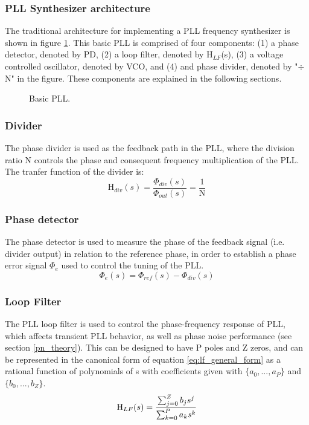 		\subsubsection{PLL Synthesizer architecture}
			The traditional architecture for implementing a PLL frequency synthesizer \cite{Razavi1996DesignOM} is shown in figure \ref{fig:basic_pll}. This basic PLL is comprised of four components: (1) a phase detector, denoted by PD, (2) a loop filter, denoted by H$_{LF}$(s), (3) a voltage controlled oscillator, denoted by VCO, and (4) and phase divider, denoted by "$\div$ N" in the figure. These components are explained in the following sections.
			\begin{figure}[htb!]
				\center
				\caption{Basic PLL.}
				\label{fig:basic_pll}
			\end{figure}
			\FloatBarrier

		\subsubsection{Divider}
			The phase divider is used as the feedback path in the PLL, where the division ratio N controls the phase and consequent frequency multiplication of the PLL. The tranfer function of the divider is:
			\begin{equation}
				\mathrm{H}_{div}(s) = \frac{\Phi_{div}(s)}{\Phi_{out}(s)} = \frac{1}{\mathrm{N}}
			\end{equation}

			\subsubsection{Phase detector}
			The phase detector is used to measure the phase of the feedback signal (i.e. divider output) in relation to the reference phase, in order to establish a phase error signal $\Phi_e$ used to control the tuning of the PLL.
			\begin{equation}
				\Phi_e(s) = \Phi_{ref}(s) - \Phi_{div}(s)
			\end{equation}

		\subsubsection{Loop Filter}
			The PLL loop filter is used to control the phase-frequency response of PLL, which affects transient PLL behavior, as well as phase noise performance (see section \ref{pn_theory}). This can be designed to have P poles and Z zeros, and can be represented in the canonical form of equation \ref{eq:lf_general_form} as a rational function of polynomials of s with coefficients given with $\{a_0, ..., a_P\}$ and $\{b_0, ..., b_Z\}$.
			\begin{equation} \label{eq:lf_general_form}
				\textnormal{H}_{LF}(s) = \frac{\sum_{j=0}^Z b_js^j}{\sum_{k=0}^P a_ks^k}
			\end{equation}
			
